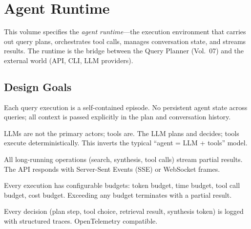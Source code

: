 \chapter{Agent Runtime}
\label{cha:agent-runtime}

This volume specifies the \emph{agent runtime}---the execution environment that carries out query plans, orchestrates tool calls, manages conversation state, and streams results. The runtime is the bridge between the Query Planner (Vol.~07) and the external world (API, CLI, LLM providers).

\section{Design Goals}
\label{sec:runtime:goals}

\begin{designprinciple}
Each query execution is a self-contained episode. No persistent agent state across queries; all context is passed explicitly in the plan and conversation history.
\end{designprinciple}

\begin{designprinciple}
LLMs are not the primary actors; tools are. The LLM plans and decides; tools execute deterministically. This inverts the typical ``agent = LLM + tools'' model.
\end{designprinciple}

\begin{designprinciple}
All long-running operations (search, synthesis, tool calls) stream partial results. The API responds with Server-Sent Events (SSE) or WebSocket frames.
\end{designprinciple}

\begin{designprinciple}
Every execution has configurable budgets: token budget, time budget, tool call budget, cost budget. Exceeding any budget terminates with a partial result.
\end{designprinciple}

\begin{designprinciple}
Every decision (plan step, tool choice, retrieval result, synthesis token) is logged with structured traces. OpenTelemetry compatible.
\end{designprinciple}

